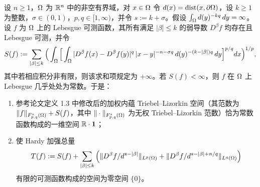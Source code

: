 \begin{theorem}[修改后的高阶内蕴空间的退化]
设 $n\ge1$，$\Omega$ 为 $\mathbb{R}^n$ 中的非空有界域，对 $x\in\Omega$ 令 $d(x)=\operatorname{dist}(x,\partial\Omega)$，设 $k\ge1$ 为整数，$\sigma\in(0,1)$，$p,q\in[1,\infty)$，并令 $s:=k+\sigma$。假设 $\int_\Omega d(y)^{-kq}\,dy=\infty$。设 $f$ 为 $\Omega$ 上的 Lebesgue 可测函数，其所有满足 $|\beta|\le k$ 的弱导数 $D^\beta f$ 均存在且 Lebesgue 可测，并令
\[
  S(f):=\sum_{|\beta|\le k}\Big(\int_\Omega\Big[\int_\Omega |D^\beta f(x)-D^\beta f(y)|^q\,|x-y|^{-n-\sigma q}\,d(y)^{-(k-|\beta|)q}\,dy\Big]^{p/q}dx\Big)^{1/p},
\]
其中若相应积分非有限，则该求和项规定为 $+\infty$。若 $S(f)<\infty$，则 $f$ 在 $\Omega$ 上 Lebesgue 几乎处处为常数。于是：
\begin{enumerate}[label=(\roman*)]
\item 参考论文定义 1.3 中修改后的加权内蕴 Triebel--Lizorkin 空间（其范数为 $\|f\|_{F^s_{p,q}(\Omega)}+S(f)$，其中 $\|\cdot\|_{F^s_{p,q}(\Omega)}$ 为无权 Triebel--Lizorkin 范数）恰为常数函数构成的一维空间 $\mathbb{R}\cdot\mathbf{1}$；
\item 使 Hardy 加强总量
\[
  T(f):=S(f)+\sum_{|\beta|\le k}\Big(\|D^\beta f/d^{s-|\beta|}\|_{L^p(\Omega)}+\|D^\beta f/d^{s-|\beta|+n/q}\|_{L^q(\Omega)}\Big)
\]
有限的可测函数构成的空间为零空间 $\{0\}$。
\end{enumerate}
\end{theorem}


